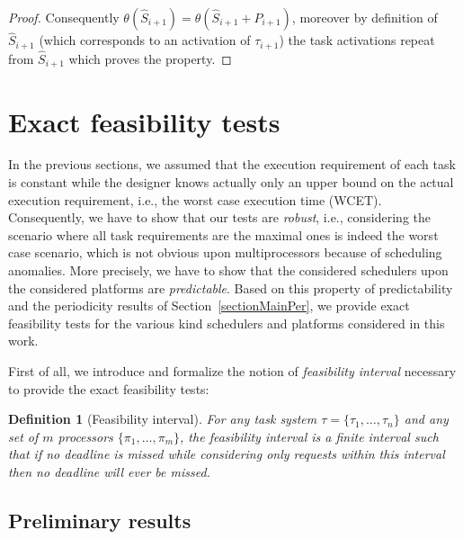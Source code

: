 \documentclass[a4paper,11pt]{article}
\newtheorem{Definition}{Definition}
\begin{document}
\begin{proof}
Consequently $\theta(\widehat{S}_{i+1})=\theta(\widehat{S}_{i+1}+P_{i+1})$, moreover by
definition of $\widehat{S}_{i+1}$ (which corresponds to an activation of
$\tau_{i+1}$) the task activations repeat from $\widehat{S}_{i+1}$ which proves
the property.
\end{proof}

\section{Exact feasibility tests} \label{sectionExactFebTest}

In the previous sections, we assumed that the execution requirement of
each task is constant while the designer knows actually only an upper
bound on the actual execution requirement, i.e., the worst case
execution time (WCET). Consequently, we have to show that our tests are
\emph{robust}, i.e., considering the scenario where all task
requirements are the maximal ones is indeed the worst case scenario,
which is not obvious upon multiprocessors because of scheduling
anomalies. More precisely, we have to show that the considered
schedulers upon the considered platforms are \emph{predictable}. Based
on this property of predictability and the periodicity results of
Section~\ref{sectionMainPer}, we provide exact feasibility tests for
the various kind schedulers and platforms considered in this work.

First of all, we introduce and formalize the notion of \emph{feasibility
interval} necessary to provide the exact feasibility tests:

\begin{Definition}[Feasibility interval]
  For any task system $\tau = \{ \tau_1, \ldots, \tau_n \}$ and any
  set of $m$ processors $\{\pi_1, \ldots, \pi_m \}$, the {\em feasibility
    interval} is a finite interval such that if no deadline is missed
  while considering only requests within this interval then no
  deadline will ever be missed.
\end{Definition}

\subsection{Preliminary results} \label{sectPremRes}
\end{document}
